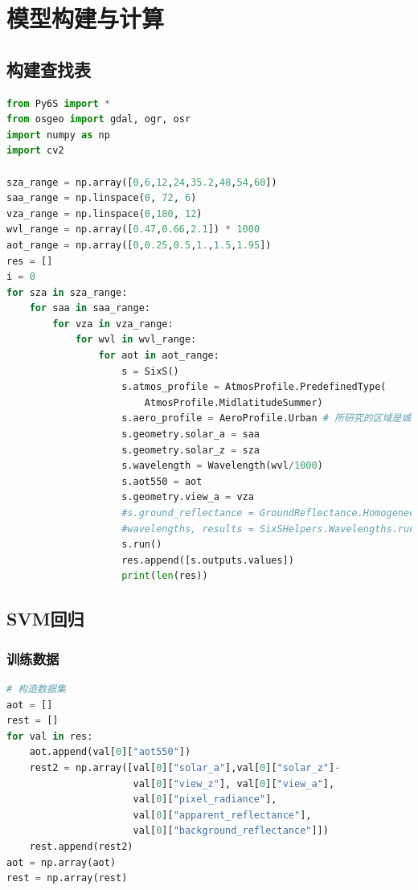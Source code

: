 \documentclass{ctexart}
\begin{document}
\begin{sloppypar}
\begin{appendices}
\begin{lstlisting}[frame=single, language=Python, basicstyle={\ttfamily}, caption={去云}, label=coderemove-cloud]
\end{lstlisting}
\section{模型构建与计算}\subsection{构建查找表}\label{lut}
\begin{lstlisting}[frame=single, language=Python, basicstyle={\ttfamily}, caption={构建查找表}]
from Py6S import *
from osgeo import gdal, ogr, osr
import numpy as np
import cv2

sza_range = np.array([0,6,12,24,35.2,48,54,60])
saa_range = np.linspace(0, 72, 6)
vza_range = np.linspace(0,180, 12)
wvl_range = np.array([0.47,0.66,2.1]) * 1000
aot_range = np.array([0,0.25,0.5,1.,1.5,1.95])
res = []
i = 0
for sza in sza_range:
    for saa in saa_range:
        for vza in vza_range:
            for wvl in wvl_range:
                for aot in aot_range:
                    s = SixS()
                    s.atmos_profile = AtmosProfile.PredefinedType(
                        AtmosProfile.MidlatitudeSummer)
                    s.aero_profile = AeroProfile.Urban # 所研究的区域是城市
                    s.geometry.solar_a = saa
                    s.geometry.solar_z = sza
                    s.wavelength = Wavelength(wvl/1000)
                    s.aot550 = aot
                    s.geometry.view_a = vza
                    #s.ground_reflectance = GroundReflectance.HomogeneousLambertian([0,.1,.2])
                    #wavelengths, results = SixSHelpers.Wavelengths.run_modis(s, output_name="aot550")
                    s.run()
                    res.append([s.outputs.values])
                    print(len(res))
\end{lstlisting}
\subsection{SVM回归}
\subsubsection{训练数据}
\begin{lstlisting}[frame=single, language=Python, label=train, basicstyle={\ttfamily}, caption={训练数据}]
# 构造数据集
aot = []
rest = []
for val in res:
    aot.append(val[0]["aot550"])
    rest2 = np.array([val[0]["solar_a"],val[0]["solar_z"]-  
                      val[0]["view_z"], val[0]["view_a"],
                      val[0]["pixel_radiance"], 
                      val[0]["apparent_reflectance"], 
                      val[0]["background_reflectance"]])
    rest.append(rest2)
aot = np.array(aot)
rest = np.array(rest)


\end{lstlisting}
\end{appendices}
\end{sloppypar}
\end{document}
